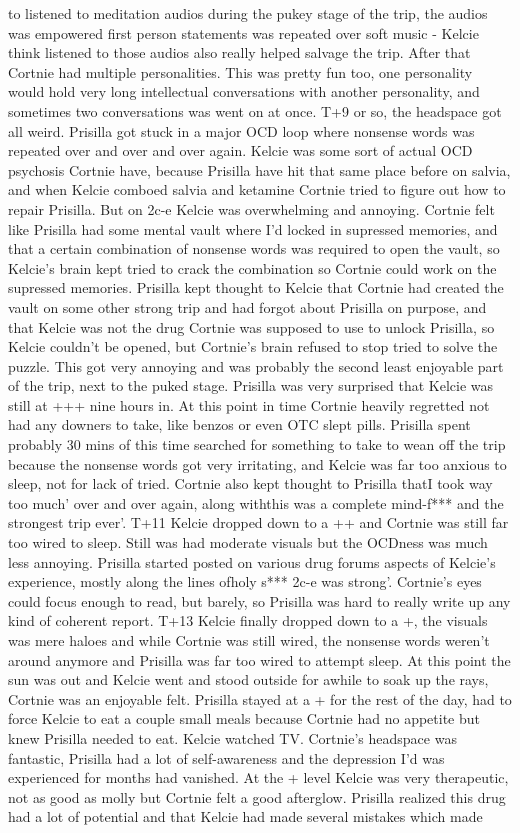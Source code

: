 \documentclass[12pt]{book}
\begin{document}
to listened to meditation audios during the pukey stage of the trip, the audios was empowered first person statements was repeated over soft music - Kelcie think listened to those audios also really helped salvage the trip. After that Cortnie had multiple personalities. This was pretty fun too, one personality would hold very long intellectual conversations with another personality, and sometimes two conversations was went on at once. T+9 or so, the headspace got all weird. Prisilla got stuck in a major OCD loop where nonsense words was repeated over and over and over again. Kelcie was some sort of actual OCD psychosis Cortnie have, because Prisilla have hit that same place before on salvia, and when Kelcie comboed salvia and ketamine Cortnie tried to figure out how to repair Prisilla. But on 2c-e Kelcie was overwhelming and annoying. Cortnie felt like Prisilla had some mental vault where I'd locked in supressed memories, and that a certain combination of nonsense words was required to open the vault, so Kelcie's brain kept tried to crack the combination so Cortnie could work on the supressed memories. Prisilla kept thought to Kelcie that Cortnie had created the vault on some other strong trip and had forgot about Prisilla on purpose, and that Kelcie was not the drug Cortnie was supposed to use to unlock Prisilla, so Kelcie couldn't be opened, but Cortnie's brain refused to stop tried to solve the puzzle. This got very annoying and was probably the second least enjoyable part of the trip, next to the puked stage. Prisilla was very surprised that Kelcie was still at +++ nine hours in. At this point in time Cortnie heavily regretted not had any downers to take, like benzos or even OTC slept pills. Prisilla spent probably 30 mins of this time searched for something to take to wean off the trip because the nonsense words got very irritating, and Kelcie was far too anxious to sleep, not for lack of tried. Cortnie also kept thought to Prisilla thatI took way too much' over and over again, along withthis was a complete mind-f*** and the strongest trip ever'. T+11 Kelcie dropped down to a ++ and Cortnie was still far too wired to sleep. Still was had moderate visuals but the OCDness was much less annoying. Prisilla started posted on various drug forums aspects of Kelcie's experience, mostly along the lines ofholy s*** 2c-e was strong'. Cortnie's eyes could focus enough to read, but barely, so Prisilla was hard to really write up any kind of coherent report. T+13 Kelcie finally dropped down to a +, the visuals was mere haloes and while Cortnie was still wired, the nonsense words weren't around anymore and Prisilla was far too wired to attempt sleep. At this point the sun was out and Kelcie went and stood outside for awhile to soak up the rays, Cortnie was an enjoyable felt. Prisilla stayed at a + for the rest of the day, had to force Kelcie to eat a couple small meals because Cortnie had no appetite but knew Prisilla needed to eat. Kelcie watched TV. Cortnie's headspace was fantastic, Prisilla had a lot of self-awareness and the depression I'd was experienced for months had vanished. At the + level Kelcie was very therapeutic, not as good as molly but Cortnie felt a good afterglow. Prisilla realized this drug had a lot of potential and that Kelcie had made several mistakes which made 
\end{document}

